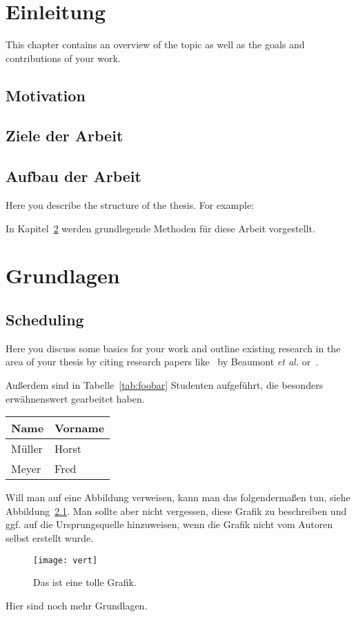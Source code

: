 
\chapter{Einleitung}\label{intro}
This chapter contains an overview of the topic as well as the goals and contributions of your work.

\section{Motivation}

\section{Ziele der Arbeit}

\section{Aufbau der Arbeit}
Here you describe the structure of the thesis. For example:

In Kapitel~\ref{background} werden grundlegende Methoden für diese Arbeit vorgestellt.


\chapter{Grundlagen}\label{background}

\section{Scheduling}
Here you discuss some basics for your work and outline existing research in the area of your thesis by citing research papers like~\cite{BCFLMR_TPDS08} by Beaumont \textit{et al.} or~\cite{legrand_ccgrid03,TelBook}.

Außerdem sind in Tabelle~\ref{tab:foobar} Studenten aufgeführt, die besonders erwähnenswert gearbeitet haben.

\begin{table}[htb]
\centering
{}
\begin{tabular}{ll}
\hline
Name & Vorname \\
\hline
Müller  &  Horst \\
Meyer & Fred \\
\hline
\end{tabular}
\end{table}

Will man auf eine Abbildung verweisen, kann man das folgendermaßen tun, siehe Abbildung~\ref{fig:foobar}.
Man sollte aber nicht vergessen, diese Grafik zu beschreiben und ggf. auf die Ursprungsquelle hinzuweisen, wenn die Grafik nicht vom Autoren selbst erstellt wurde.

\begin{figure}[htb]
\centering
\texttt{[image: vert]}
\caption[Kurzname der tollen Grafik]{\label{fig:foobar}Das ist eine tolle Grafik.}
\end{figure}

\clearpage
Hier sind noch mehr Grundlagen.
